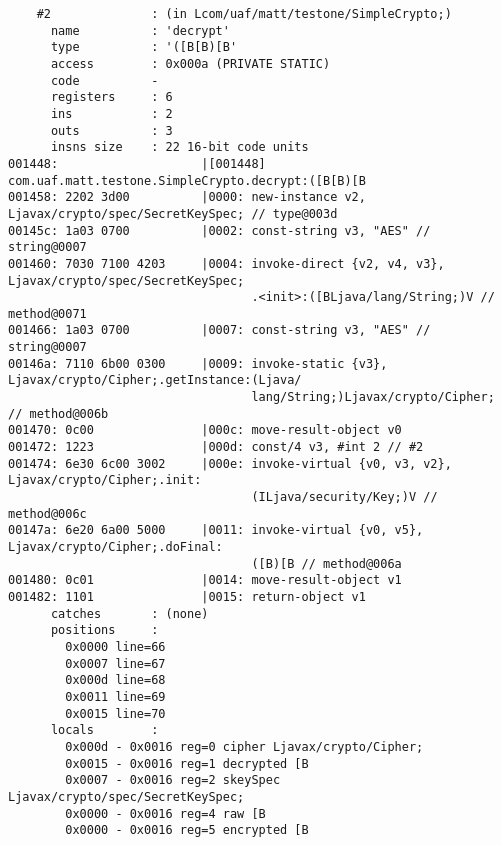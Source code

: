 \begin{lstlisting}
    #2              : (in Lcom/uaf/matt/testone/SimpleCrypto;)
      name          : 'decrypt'
      type          : '([B[B)[B'
      access        : 0x000a (PRIVATE STATIC)
      code          -
      registers     : 6
      ins           : 2
      outs          : 3
      insns size    : 22 16-bit code units
001448:                    |[001448] com.uaf.matt.testone.SimpleCrypto.decrypt:([B[B)[B
001458: 2202 3d00          |0000: new-instance v2, Ljavax/crypto/spec/SecretKeySpec; // type@003d
00145c: 1a03 0700          |0002: const-string v3, "AES" // string@0007
001460: 7030 7100 4203     |0004: invoke-direct {v2, v4, v3}, Ljavax/crypto/spec/SecretKeySpec;
                                  .<init>:([BLjava/lang/String;)V // method@0071
001466: 1a03 0700          |0007: const-string v3, "AES" // string@0007
00146a: 7110 6b00 0300     |0009: invoke-static {v3}, Ljavax/crypto/Cipher;.getInstance:(Ljava/
                                  lang/String;)Ljavax/crypto/Cipher; // method@006b
001470: 0c00               |000c: move-result-object v0
001472: 1223               |000d: const/4 v3, #int 2 // #2
001474: 6e30 6c00 3002     |000e: invoke-virtual {v0, v3, v2}, Ljavax/crypto/Cipher;.init:
                                  (ILjava/security/Key;)V // method@006c
00147a: 6e20 6a00 5000     |0011: invoke-virtual {v0, v5}, Ljavax/crypto/Cipher;.doFinal:
                                  ([B)[B // method@006a
001480: 0c01               |0014: move-result-object v1
001482: 1101               |0015: return-object v1
      catches       : (none)
      positions     :
        0x0000 line=66
        0x0007 line=67
        0x000d line=68
        0x0011 line=69
        0x0015 line=70
      locals        :
        0x000d - 0x0016 reg=0 cipher Ljavax/crypto/Cipher;
        0x0015 - 0x0016 reg=1 decrypted [B
        0x0007 - 0x0016 reg=2 skeySpec Ljavax/crypto/spec/SecretKeySpec;
        0x0000 - 0x0016 reg=4 raw [B
        0x0000 - 0x0016 reg=5 encrypted [B


\end{lstlisting}
